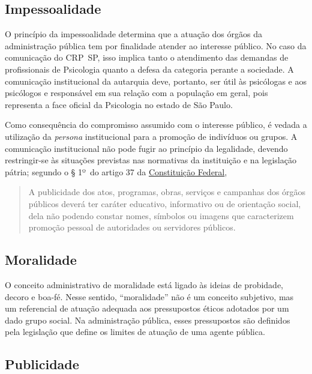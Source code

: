 \subsection{Impessoalidade}

O princípio da impessoalidade determina que a atuação dos órgãos da
administração pública tem por finalidade atender ao interesse público.
No caso da comunicação do CRP~SP, isso implica tanto o atendimento das
demandas de profissionais de Psicologia quanto a defesa da categoria
perante a sociedade. A comunicação institucional da autarquia deve,
portanto, ser útil às psicólogas e aos psicólogos e responsável em sua
relação com a população em geral, pois representa a face oficial da
Psicologia no estado de São Paulo.

Como consequência do compromisso assumido com o interesse público, é
vedada a utilização da \emph{persona} institucional para a promoção de
indivíduos ou grupos. A comunicação institucional não pode fugir ao
princípio da legalidade, devendo restringir-se às situações previstas
nas normativas da instituição e na legislação pátria; segundo o § 1º~do
artigo 37 da
\href{https://www.google.com/url?sa=t&source=web&rct=j&opi=89978449&url=https://www.planalto.gov.br/ccivil_03/constituicao/constituicao.htm&ved=2ahUKEwjlis2B_MKJAxXcHrkGHTtTAvcQFnoECBgQAQ&usg=AOvVaw3i_8717crw9PBIV4q9Jndm}{{Constituição
			Federal}},

\begin{quote}
	A publicidade dos atos, programas, obras, serviços e campanhas dos
	órgãos públicos deverá ter caráter educativo, informativo ou de
	orientação social, dela não podendo constar nomes, símbolos ou imagens
	que caracterizem promoção pessoal de autoridades ou servidores públicos.
\end{quote}

\subsection{Moralidade}

O conceito administrativo de moralidade está ligado às ideias de
probidade, decoro e boa-fé. Nesse sentido, ``moralidade'' não é um
conceito subjetivo, mas um referencial de atuação adequada aos
pressupostos éticos adotados por um dado grupo social. Na administração
pública, esses pressupostos são definidos pela legislação que define os
limites de atuação de uma agente pública.

\subsection{Publicidade}


